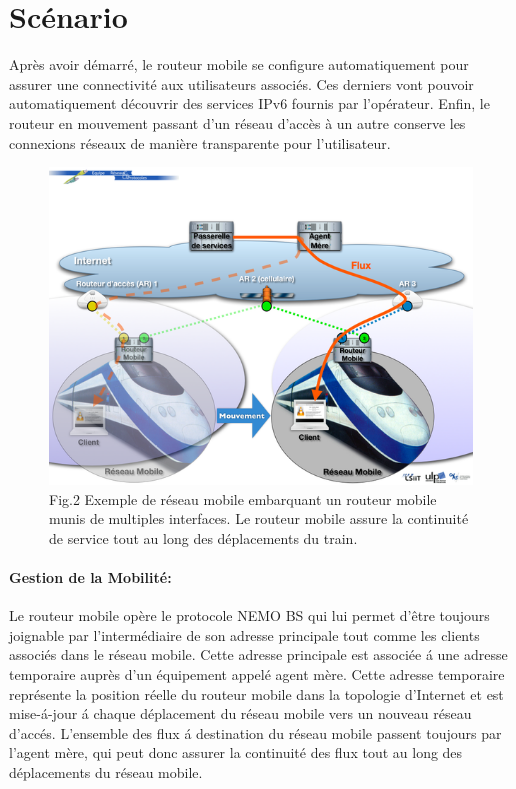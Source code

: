 \documentclass[12pt]{article}
\begin{document}
\newpage
\section{Sc\'{e}nario}

Apr\`{e}s avoir d\'{e}marr\'{e}, le routeur mobile se configure automatiquement pour assurer une connectivit\'{e} aux utilisateurs associ\'{e}s. Ces derniers vont pouvoir automatiquement d\'{e}couvrir des services IPv6 fournis par l'op\'{e}rateur. Enfin, le routeur en mouvement passant d'un r\'{e}seau d'acc\`{e}s à un autre conserve les connexions r\'{e}seaux de mani\`{e}re transparente pour l'utilisateur.
\begin{figure}[h]
\begin{center}
\includegraphics[scale=0.7]{R2.png}
\caption[9pt]{Fig.2 Exemple de r\'{e}seau mobile embarquant un routeur mobile munis de multiples interfaces. Le routeur mobile assure la continuit\'{e} de service tout au long des d\'{e}placements du train.}
\end{center}
\end{figure}

\newpage
\paragraph{Gestion de la Mobilit\'{e}:} 
Le routeur mobile op\`{e}re le protocole NEMO BS qui lui permet d'\^{e}tre toujours joignable par l'interm\'{e}diaire de son adresse principale tout comme les clients associ\'{e}s dans le r\'{e}seau mobile. Cette adresse principale est associ\'{e}e \'{a} une adresse temporaire aupr\`{e}s d'un \'{e}quipement appel\'{e} agent m\`{e}re. Cette adresse temporaire repr\'{e}sente la position r\'{e}elle du routeur mobile dans la topologie d'Internet et est mise-\'{a}-jour \'{a} chaque d\'{e}placement du r\'{e}seau mobile vers un nouveau r\'{e}seau d'acc\'{e}s.
L'ensemble des flux \'{a} destination du r\'{e}seau mobile passent toujours par l'agent m\`{e}re, qui peut donc assurer la continuit\'{e} des flux tout au long des d\'{e}placements du r\'{e}seau mobile.
\end{document}
